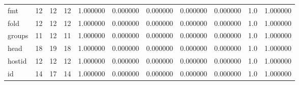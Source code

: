 \begin{longtable}{lrrrrrrrrrr}
fmt       &                                      12 &                 12 &                                12 &                                   1.000000 &                               0.000000 &                                     0.000000 &                          0.000000 &                                0.000000 &                                1.0 &                                           1.000000 \\
fold      &                                      12 &                 12 &                                12 &                                   1.000000 &                               0.000000 &                                     0.000000 &                          0.000000 &                                0.000000 &                                1.0 &                                           1.000000 \\
groups    &                                      11 &                 12 &                                11 &                                   1.000000 &                               0.000000 &                                     0.000000 &                          0.000000 &                                0.000000 &                                1.0 &                                           1.000000 \\
head      &                                      18 &                 19 &                                18 &                                   1.000000 &                               0.000000 &                                     0.000000 &                          0.000000 &                                0.000000 &                                1.0 &                                           1.000000 \\
hostid    &                                      12 &                 12 &                                12 &                                   1.000000 &                               0.000000 &                                     0.000000 &                          0.000000 &                                0.000000 &                                1.0 &                                           1.000000 \\
id        &                                      14 &                 17 &                                14 &                                   1.000000 &                               0.000000 &                                     0.000000 &                          0.000000 &                                0.000000 &                                1.0 &                                           1.000000 \\

\end{longtable}
